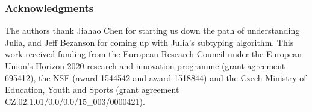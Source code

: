 \documentclass[a4paper,english]{lipics-v2019}
\begin{document}
\subsubsection*{Acknowledgments}
The authors thank Jiahao Chen for starting us down the path of understanding
Julia, and Jeff Bezanson for coming up with Julia's subtyping algorithm.  This
work received funding from the European Research Council under the European
Union's Horizon 2020 research and innovation programme (grant agreement
695412), the NSF (award 1544542 and award 1518844) and the Czech Ministry of
Education, Youth and Sports (grant agreement
CZ.02.1.01/0.0/0.0/15\_003/0000421).
 

%

\end{document}
